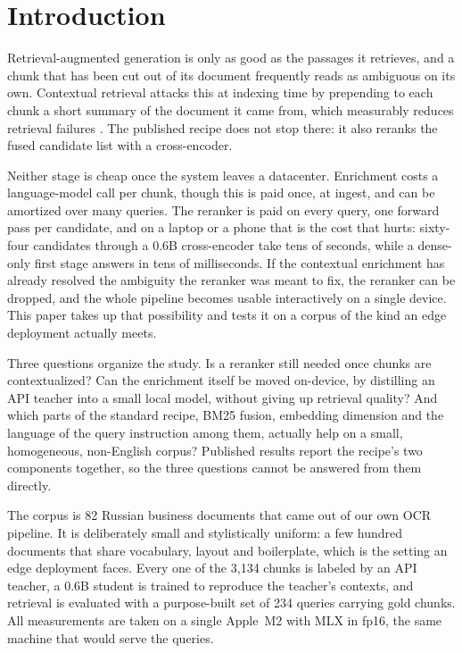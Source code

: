 \section{Introduction}
\label{sec:intro}

Retrieval-augmented generation is only as good as the passages it retrieves,
and a chunk that has been cut out of its document frequently reads as
ambiguous on its own. Contextual retrieval attacks this at indexing time by
prepending to each chunk a short summary of the document it came from, which
measurably reduces retrieval failures \citep{anthropic2024contextual}. The
published recipe does not stop there: it also reranks the fused candidate list
with a cross-encoder.

Neither stage is cheap once the system leaves a datacenter. Enrichment costs a
language-model call per chunk, though this is paid once, at ingest, and can be
amortized over many queries. The reranker is paid on every query, one forward
pass per candidate, and on a laptop or a phone that is the cost that hurts:
sixty-four candidates through a 0.6B cross-encoder take tens of seconds, while
a dense-only first stage answers in tens of milliseconds. If the contextual
enrichment has already resolved the ambiguity the reranker was meant to fix,
the reranker can be dropped, and the whole pipeline becomes usable
interactively on a single device. This paper takes up that possibility and
tests it on a corpus of the kind an edge deployment actually meets.

Three questions organize the study. Is a reranker still needed once chunks are
contextualized? Can the enrichment itself be moved on-device, by distilling an
API teacher into a small local model, without giving up retrieval quality? And
which parts of the standard recipe, BM25 fusion, embedding dimension and the
language of the query instruction among them, actually help on a small,
homogeneous, non-English corpus? Published results report the recipe's two
components together, so the three questions cannot be answered from them
directly.

The corpus is 82 Russian business documents that came out of our own OCR
pipeline. It is deliberately small and stylistically uniform: a few hundred
documents that share vocabulary, layout and boilerplate, which is the setting an
edge deployment faces. Every one of the 3{,}134 chunks is labeled by an API
teacher, a 0.6B student is trained to reproduce the teacher's contexts, and
retrieval is evaluated with a purpose-built set of 234 queries carrying gold
chunks. All measurements are taken on a single Apple~M2 with MLX in fp16, the
same machine that would serve the queries.


